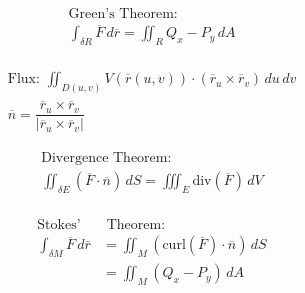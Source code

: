 \documentclass[12pt]{article}
\begin{document}
\begin{multicols}{2}

  \begin{equation*}
    \begin{split}
      \text{Green's Theorem:}\\
      \int_{\delta R}\overline{F}\,d\overline{r}=\iint_R Q_x-P_y\,dA\\
    \end{split}
  \end{equation*}

  \begin{equation*}
    \begin{split}
      \text{Flux: }\iint_{D(u,v)}V(\overline{r}(u,v))\cdot(\overline{r}_u\times\overline{r}_v)\,du\,dv\\
      \overline{n}=\dfrac{\overline{r}_u\times\overline{r}_v}{|\overline{r}_u\times\overline{r}_v|}
    \end{split}
  \end{equation*}

\end{multicols}

\vspace{-30pt}

\begin{multicols}{2}

  \begin{equation*}
    \begin{split}
      \text{Divergence Theorem:}\\
      \iint_{\delta E}(\overline{F}\cdot\overline{n})\,dS=\iiint_E\text{div}(\overline{F})\,dV\\
    \end{split}
  \end{equation*}

  \begin{equation*}
    \begin{split}
    \text{Stokes'}& \text{ Theorem:}\\
      \int_{\delta M}\overline{F}\,d\overline{r}&=\iint_M(\text{curl}(\overline{F})\cdot\overline{n})\,dS\\
      &=\iint_M(Q_x-P_y)\,dA
    \end{split}
  \end{equation*}

\end{multicols}
\end{document}

